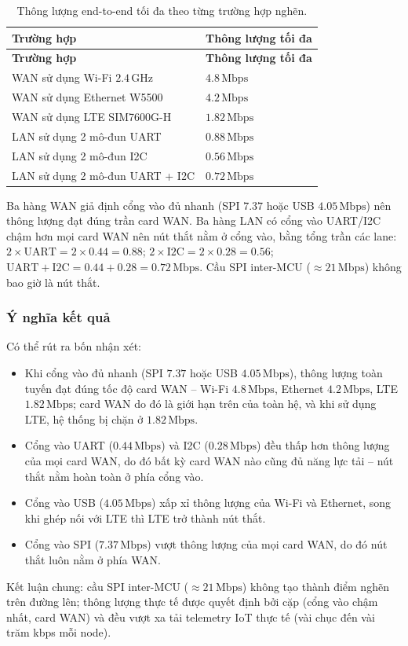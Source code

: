 \begin{longtable}{|p{7.5cm}|p{4cm}|}
    \caption{Thông lượng end-to-end tối đa theo từng trường hợp nghẽn.}
    \label{tab:e2e_throughput} \\
    \hline
    \textbf{Trường hợp} & \textbf{Thông lượng tối đa} \\ \hline
    \endfirsthead
    \hline
    \textbf{Trường hợp} & \textbf{Thông lượng tối đa} \\ \hline
    \endhead
    \hline
    \endfoot
    \endlastfoot
    WAN sử dụng Wi-Fi $2{.}4\,\text{GHz}$ & $4{.}8\,\text{Mbps}$ \\ \hline
    WAN sử dụng Ethernet W5500 & $4{.}2\,\text{Mbps}$ \\ \hline
    WAN sử dụng LTE SIM7600G-H & $1{.}82\,\text{Mbps}$ \\ \hline
    LAN sử dụng 2 mô-đun UART & $0{.}88\,\text{Mbps}$ \\ \hline
    LAN sử dụng 2 mô-đun I2C & $0{.}56\,\text{Mbps}$ \\ \hline
    LAN sử dụng 2 mô-đun UART + I2C & $0{.}72\,\text{Mbps}$ \\ \hline
\end{longtable}

Ba hàng WAN giả định cổng vào đủ nhanh (SPI $7{.}37$ hoặc USB $4{.}05\,\text{Mbps}$) nên thông lượng đạt đúng trần card WAN. Ba hàng LAN có cổng vào UART/I2C chậm hơn mọi card WAN nên nút thắt nằm ở cổng vào, bằng tổng trần các lane: $2\times\text{UART} = 2\times0{.}44 = 0{.}88$; $2\times\text{I2C} = 2\times0{.}28 = 0{.}56$; $\text{UART}+\text{I2C} = 0{.}44+0{.}28 = 0{.}72\,\text{Mbps}$. Cầu SPI inter-MCU ($\approx 21\,\text{Mbps}$) không bao giờ là nút thắt.

\subsubsection{Ý nghĩa kết quả}

Có thể rút ra bốn nhận xét:
\begin{itemize}
    \item Khi cổng vào đủ nhanh (SPI $7{.}37$ hoặc USB $4{.}05\,\text{Mbps}$), thông lượng toàn tuyến đạt đúng tốc độ card WAN -- Wi-Fi $4{.}8\,\text{Mbps}$, Ethernet $4{.}2\,\text{Mbps}$, LTE $1{.}82\,\text{Mbps}$; card WAN do đó là giới hạn trên của toàn hệ, và khi sử dụng LTE, hệ thống bị chặn ở $1{.}82\,\text{Mbps}$.
    \item Cổng vào UART ($0{.}44\,\text{Mbps}$) và I2C ($0{.}28\,\text{Mbps}$) đều thấp hơn thông lượng của mọi card WAN, do đó bất kỳ card WAN nào cũng đủ năng lực tải -- nút thắt nằm hoàn toàn ở phía cổng vào.
    \item Cổng vào USB ($4{.}05\,\text{Mbps}$) xấp xỉ thông lượng của Wi-Fi và Ethernet, song khi ghép nối với LTE thì LTE trở thành nút thắt.
    \item Cổng vào SPI ($7{.}37\,\text{Mbps}$) vượt thông lượng của mọi card WAN, do đó nút thắt luôn nằm ở phía WAN.
\end{itemize}
Kết luận chung: cầu SPI inter-MCU ($\approx 21\,\text{Mbps}$) không tạo thành điểm nghẽn trên đường lên; thông lượng thực tế được quyết định bởi cặp (cổng vào chậm nhất, card WAN) và đều vượt xa tải telemetry IoT thực tế (vài chục đến vài trăm kbps mỗi node).

